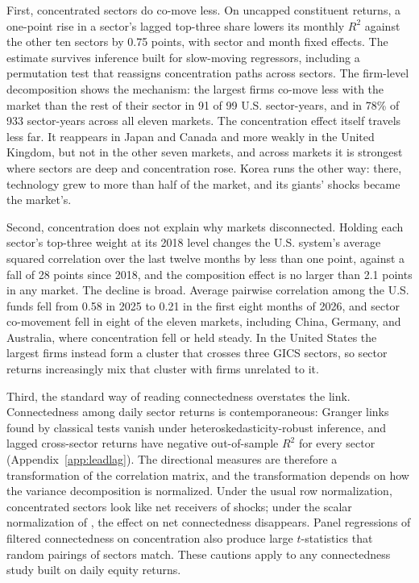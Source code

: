 \documentclass[11pt]{article}
\begin{document}
First, concentrated sectors do co-move less. On uncapped constituent returns, a one-point rise in a sector's lagged top-three share lowers its monthly $R^2$ against the other ten sectors by 0.75 points, with sector and month fixed effects. The estimate survives inference built for slow-moving regressors, including a permutation test that reassigns concentration paths across sectors. The firm-level decomposition shows the mechanism: the largest firms co-move less with the market than the rest of their sector in 91 of 99 U.S. sector-years, and in 78\% of 933 sector-years across all eleven markets. The concentration effect itself travels less far. It reappears in Japan and Canada and more weakly in the United Kingdom, but not in the other seven markets, and across markets it is strongest where sectors are deep and concentration rose. Korea runs the other way: there, technology grew to more than half of the market, and its giants' shocks became the market's.

Second, concentration does not explain why markets disconnected. Holding each sector's top-three weight at its 2018 level changes the U.S. system's average squared correlation over the last twelve months by less than one point, against a fall of 28 points since 2018, and the composition effect is no larger than 2.1 points in any market. The decline is broad. Average pairwise correlation among the U.S. funds fell from 0.58 in 2025 to 0.21 in the first eight months of 2026, and sector co-movement fell in eight of the eleven markets, including China, Germany, and Australia, where concentration fell or held steady. In the United States the largest firms instead form a cluster that crosses three GICS sectors, so sector returns increasingly mix that cluster with firms unrelated to it.

Third, the standard way of reading connectedness overstates the link. Connectedness among daily sector returns is contemporaneous: Granger links found by classical tests vanish under heteroskedasticity-robust inference, and lagged cross-sector returns have negative out-of-sample $R^2$ for every sector (Appendix~\ref{app:leadlag}). The directional measures are therefore a transformation of the correlation matrix, and the transformation depends on how the variance decomposition is normalized. Under the usual row normalization, concentrated sectors look like net receivers of shocks; under the scalar normalization of \citet{caloia2019}, the effect on net connectedness disappears. Panel regressions of filtered connectedness on concentration also produce large $t$-statistics that random pairings of sectors match. These cautions apply to any connectedness study built on daily equity returns.
\end{document}
